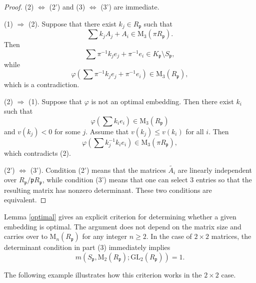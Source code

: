 \documentclass[12pt]{article}
\theoremstyle{plain}
\theoremstyle{definition}
\theoremstyle{remark}
\begin{document}
\begin{proof}
(2) $\Leftrightarrow$ (2') and (3) $\Leftrightarrow$ (3') are immediate.

(1) $\Rightarrow$ (2). Suppose that there exist $k_j \in R_\mathfrak{p}$ such that $$\sum k_j A_j + A_i \in \mathrm{M}_3(\pi R_\mathfrak{p}).$$ Then $$\sum \pi^{-1} k_j e_j + \pi^{-1} e_i \in K_\mathfrak{p} \setminus S_\mathfrak{p},$$ while $$\varphi\!\left(\sum \pi^{-1} k_j e_j + \pi^{-1} e_i\right) \in \mathrm{M}_3(R_\mathfrak{p}),$$ which is a contradiction.

(2) $\Rightarrow$ (1). Suppose that $\varphi$ is not an optimal embedding. Then there exist $k_i$ such that $$\varphi\!\left(\sum k_i e_i\right) \in \mathrm{M}_3(R_\mathfrak{p})$$ and $v(k_j) < 0$ for some $j$. Assume that $v(k_j) \le v(k_i)$ for all $i$. Then $$\varphi\!\left(\sum k_j^{-1} k_i e_i\right) \in \mathrm{M}_3(\pi R_\mathfrak{p}),$$ which contradicts (2).

(2') $\Leftrightarrow$ (3'). Condition (2') means that the matrices $\widetilde{A_i}$ are linearly independent over $R_\mathfrak{p}/\mathfrak{p}R_\mathfrak{p}$, while condition (3') means that one can select $3$ entries so that the resulting matrix has nonzero determinant. These two conditions are equivalent.
\end{proof}

Lemma \ref{optimal} gives an explicit criterion for determining whether a given embedding is optimal. The argument does not depend on the matrix size and carries over to $\mathrm{M}_n(R_\mathfrak{p})$ for any integer $n \ge 2$. In the case of $2\times 2$ matrices, the determinant condition in part (3) immediately implies
$$m(S_\mathfrak{p},\mathrm{M}_2(R_\mathfrak{p});\mathrm{GL}_2(R_\mathfrak{p}))=1.$$

The following example illustrates how this criterion works in the $2\times 2$ case.
\end{document}

